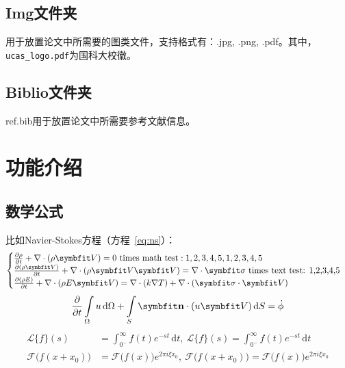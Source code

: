 \subsection{Img文件夹}

用于放置论文中所需要的图类文件，支持格式有：.jpg, .png, .pdf。其中，\verb|ucas_logo.pdf|为国科大校徽。

\subsection{Biblio文件夹}

 ref.bib用于放置论文中所需要参考文献信息。

\section{功能介绍}

\subsection{数学公式}

比如Navier-Stokes方程（方程~\eqref{eq:ns}）：
\begin{equation} \label{eq:ns}
    \begin{cases}
        \frac{\partial \rho}{\partial t} + \nabla\cdot(\rho\Vector{V}) = 0 \ \mathrm{times\ math\ test: 1,2,3,4,5}, 1,2,3,4,5\\
        \frac{\partial (\rho\Vector{V})}{\partial t} + \nabla\cdot(\rho\Vector{V}\Vector{V}) = \nabla\cdot\Tensor{\sigma} \ \text{times text test: 1,2,3,4,5}\\
        \frac{\partial (\rho E)}{\partial t} + \nabla\cdot(\rho E\Vector{V}) = \nabla\cdot(k\nabla T) + \nabla\cdot(\Tensor{\sigma}\cdot\Vector{V})
    \end{cases}
\end{equation}
\begin{equation}
    \frac{\partial }{\partial t}\int\limits_{\Omega} u \, \mathrm{d}\Omega + \int\limits_{S} \unitVector{n}\cdot(u\Vector{V}) \, \mathrm{d}S = \dot{\phi}
\end{equation}
\[
    \begin{split}
        \mathcal{L} \{f\}(s) &= \int _{0^{-}}^{\infty} f(t) e^{-st} \, \mathrm{d}t, \ 
        \mathscr{L} \{f\}(s) = \int _{0^{-}}^{\infty} f(t) e^{-st} \, \mathrm{d}t\\
        \mathcal{F} {\bigl (} f(x+x_{0}) {\bigr )} &= \mathcal{F} {\bigl (} f(x) {\bigr )} e^{2\pi i\xi x_{0}}, \ 
        \mathscr{F} {\bigl (} f(x+x_{0}) {\bigr )} = \mathscr{F} {\bigl (} f(x) {\bigr )} e^{2\pi i\xi x_{0}}
    \end{split}
\]

